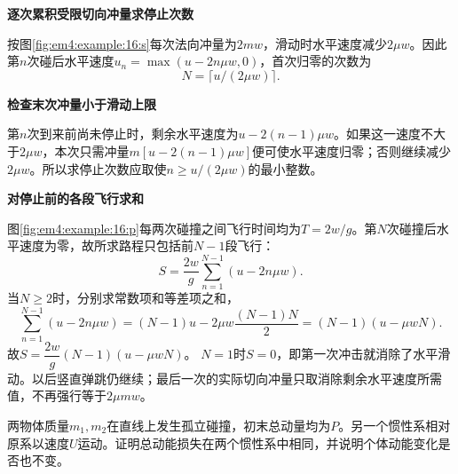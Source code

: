 \begin{solution}\textbf{逐次累积受限切向冲量求停止次数}\par\nobreak
按图\ref{fig:em4:example:16:s}每次法向冲量为$2mw$，滑动时水平速度减少$2\mu w$。因此第$n$次碰后水平速度$u_n=\max(u-2n\mu w,0)$，首次归零的次数为
\[\boxed{N=\lceil u/(2\mu w)\rceil}.\]




\par\medskip{}\noindent\textbf{检查末次冲量小于滑动上限}\par\nobreak
第$n$次到来前尚未停止时，剩余水平速度为$u-2(n-1)\mu w$。如果这一速度不大于$2\mu w$，本次只需冲量$m[u-2(n-1)\mu w]$便可使水平速度归零；否则继续减少$2\mu w$。所以求停止次数应取使$n\ge u/(2\mu w)$的最小整数。



\par\medskip{}\noindent\textbf{对停止前的各段飞行求和}\par\nobreak
图\ref{fig:em4:example:16:p}每两次碰撞之间飞行时间均为$T=2w/g$。第$N$次碰撞后水平速度为零，故所求路程只包括前$N-1$段飞行：
\[
S=\frac{2w}{g}\sum_{n=1}^{N-1}(u-2n\mu w).
\]
当$N\ge2$时，分别求常数项和等差项之和，
\[
\sum_{n=1}^{N-1}(u-2n\mu w)
=(N-1)u-2\mu w\frac{(N-1)N}{2}
=(N-1)(u-\mu wN).
\]
故$\boxed{S=\dfrac{2w}{g}(N-1)(u-\mu wN)}$。
$N=1$时$S=0$，即第一次冲击就消除了水平滑动。以后竖直弹跳仍继续；最后一次的实际切向冲量只取消除剩余水平速度所需值，不再强行等于$2\mu mw$。\end{solution}
\begin{question}\begin{example}[碰撞耗散与惯性系变换]\label{em4:example:17}
两物体质量$m_1,m_2$在直线上发生孤立碰撞，初末总动量均为$P$。另一个惯性系相对原系以速度$U$运动。证明总动能损失在两个惯性系中相同，并说明个体动能变化是否也不变。
\end{example}
\end{question}
